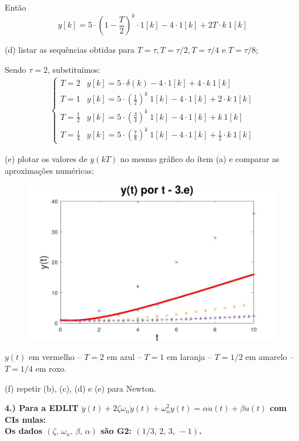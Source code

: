 \documentclass[10pt]{article}
\begin{document}
Então
\[y[k] = 5 \cdot \left(1 - \frac{T}{2}\right)^k \cdot 1[k] - 4 \cdot 1[k] + 2T \cdot k\ 1[k]\]

(d) listar as sequências obtidas para $T = \tau, T = \tau / 2, T = \tau / 4 \text{ e } T = \tau / 8$;

Sendo $\tau = 2$, substituímos:
\begin{align*}
    \begin{cases}
        T = 2 & y[k] = 5 \cdot \delta(k) - 4 \cdot 1[k] + 4 \cdot k\ 1[k]\\
        T = 1 & y[k] = 5 \cdot \left(\frac{1}{2}\right)^k \ 1[k] - 4 \cdot 1[k] + 2 \cdot k\ 1[k]\\
        T = \frac{1}{2} & y[k] = 5 \cdot \left(\frac{3}{4}\right)^k \ 1[k] - 4 \cdot 1[k] + k\ 1[k]\\
        T = \frac{1}{4} & y[k] = 5 \cdot \left(\frac{7}{8}\right)^k \ 1[k] - 4 \cdot 1[k] + \frac{1}{2} \cdot k\ 1[k]
    \end{cases}
\end{align*}

(e) plotar os valores de $y(kT)$ no mesmo gráfico do ítem (a) e comparar as aproximações numéricas;

\begin{figure}[h]
    \includegraphics[scale=0.4]{questao3e.jpg}
    \centering
\end{figure}
$y(t)$ em vermelho -- $T = 2$ em azul -- $T = 1$ em laranja -- $T = 1/2$ em amarelo -- $T = 1/4$ em roxo.

(f) repetir (b), (c), (d) e (e) para Newton.

\vspace{\baselineskip}


\textbf{4.) Para a EDLIT $\ddot{y}(t) + 2\zeta \omega_n \dot{y}(t) + \omega_n^2 y(t) = \alpha \dot{u}(t) + \beta u(t)$ com CIs nulas:\\
Os dados $(\zeta,\, \omega_n,\, \beta,\, \alpha)$ são \textbf{G2: }$(1/3,\, 2,\, 3,\, -1)$.}
\end{document}
